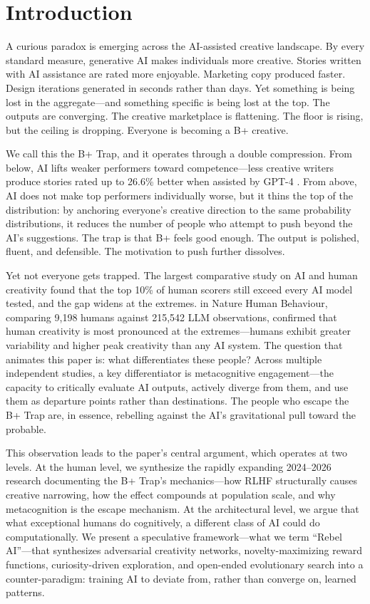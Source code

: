 \documentclass[12pt,a4paper]{article}
\begin{document}
\section{Introduction}
A curious paradox is emerging across the AI-assisted creative landscape. By every standard measure, generative AI makes individuals more creative. Stories written with AI assistance are rated more enjoyable. Marketing copy produced faster. Design iterations generated in seconds rather than days. Yet something is being lost in the aggregate---and something specific is being lost at the top. The outputs are converging. The creative marketplace is flattening. The floor is rising, but the ceiling is dropping. Everyone is becoming a B+ creative.

We call this the B+ Trap, and it operates through a double compression. From below, AI lifts weaker performers toward competence---less creative writers produce stories rated up to 26.6\% better when assisted by GPT-4 \citep{doshi2024}. From above, AI does not make top performers individually worse, but it thins the top of the distribution: by anchoring everyone's creative direction to the same probability distributions, it reduces the number of people who attempt to push beyond the AI's suggestions. The trap is that B+ feels good enough. The output is polished, fluent, and defensible. The motivation to push further dissolves.

Yet not everyone gets trapped. The largest comparative study on AI and human creativity \citep{bellemare2026} found that the top 10\% of human scorers still exceed every AI model tested, and the gap widens at the extremes. \citet{wang2025} in Nature Human Behaviour, comparing 9,198 humans against 215,542 LLM observations, confirmed that human creativity is most pronounced at the extremes---humans exhibit greater variability and higher peak creativity than any AI system. The question that animates this paper is: what differentiates these people? Across multiple independent studies, a key differentiator is metacognitive engagement---the capacity to critically evaluate AI outputs, actively diverge from them, and use them as departure points rather than destinations. The people who escape the B+ Trap are, in essence, rebelling against the AI's gravitational pull toward the probable.

This observation leads to the paper's central argument, which operates at two levels. At the human level, we synthesize the rapidly expanding 2024--2026 research documenting the B+ Trap's mechanics---how RLHF structurally causes creative narrowing, how the effect compounds at population scale, and why metacognition is the escape mechanism. At the architectural level, we argue that what exceptional humans do cognitively, a different class of AI could do computationally. We present a speculative framework---what we term ``Rebel AI''---that synthesizes adversarial creativity networks, novelty-maximizing reward functions, curiosity-driven exploration, and open-ended evolutionary search into a counter-paradigm: training AI to deviate from, rather than converge on, learned patterns.
\end{document}
